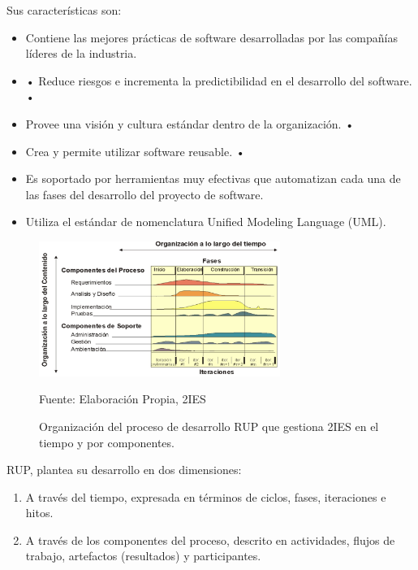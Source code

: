 Sus características son:

\begin{itemize}
    \item Contiene las mejores prácticas de software desarrolladas por las compañías líderes de la industria.
    \item• Reduce riesgos e incrementa la predictibilidad en el desarrollo del software. • 
    \item Provee una visión y cultura estándar dentro de la organización. • 
    \item Crea y permite utilizar software reusable. • 
    \item Es soportado por herramientas muy efectivas que automatizan cada una de las fases del desarrollo del proyecto de software.
    \item Utiliza el estándar de nomenclatura Unified Modeling Language (UML).
\end{itemize}

\begin{figure}[htbp]
    \centering
    \includegraphics[width=0.7\textwidth]{assets/RUPGRAPH.JPG}
    \caption{Organización del proceso de desarrollo RUP que gestiona 2IES en el tiempo y por componentes.}{Fuente: Elaboración Propia, 2IES}
    \label{fig:rupgraph}
\end{figure}

RUP, plantea su desarrollo en dos dimensiones:

\begin{enumerate}
    \item A través del tiempo, expresada en términos de ciclos, fases, iteraciones e hitos.
    \item A través de los componentes del proceso, descrito en actividades, flujos de trabajo, artefactos (resultados) y participantes.
\end{enumerate}
